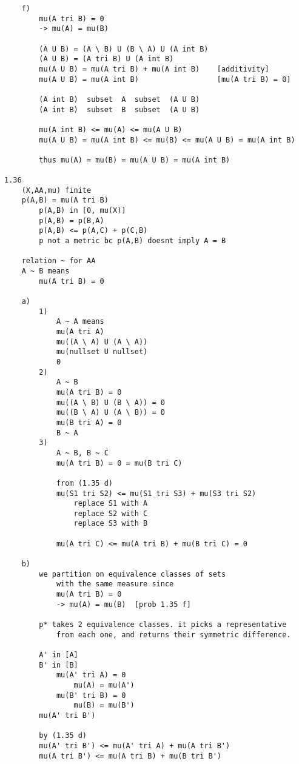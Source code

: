 \documentclass{article}
\begin{document}
\begin{flushleft}
\begin{verbatim}
    f)
        mu(A tri B) = 0
        -> mu(A) = mu(B)

        (A U B) = (A \ B) U (B \ A) U (A int B)
        (A U B) = (A tri B) U (A int B)
        mu(A U B) = mu(A tri B) + mu(A int B)    [additivity]
        mu(A U B) = mu(A int B)                  [mu(A tri B) = 0]

        (A int B)  subset  A  subset  (A U B)        
        (A int B)  subset  B  subset  (A U B)        

        mu(A int B) <= mu(A) <= mu(A U B)
        mu(A U B) = mu(A int B) <= mu(B) <= mu(A U B) = mu(A int B)

        thus mu(A) = mu(B) = mu(A U B) = mu(A int B)

1.36
    (X,AA,mu) finite 
    p(A,B) = mu(A tri B)
        p(A,B) in [0, mu(X)]
        p(A,B) = p(B,A)
        p(A,B) <= p(A,C) + p(C,B)
        p not a metric bc p(A,B) doesnt imply A = B

    relation ~ for AA
    A ~ B means 
        mu(A tri B) = 0

    a)
        1)
            A ~ A means 
            mu(A tri A)
            mu((A \ A) U (A \ A))
            mu(nullset U nullset) 
            0
        2)
            A ~ B 
            mu(A tri B) = 0 
            mu((A \ B) U (B \ A)) = 0
            mu((B \ A) U (A \ B)) = 0
            mu(B tri A) = 0 
            B ~ A
        3)
            A ~ B, B ~ C 
            mu(A tri B) = 0 = mu(B tri C)

            from (1.35 d)
            mu(S1 tri S2) <= mu(S1 tri S3) + mu(S3 tri S2)
                replace S1 with A 
                replace S2 with C 
                replace S3 with B

            mu(A tri C) <= mu(A tri B) + mu(B tri C) = 0

    b)
        we partition on equivalence classes of sets 
            with the same measure since 
            mu(A tri B) = 0 
            -> mu(A) = mu(B)  [prob 1.35 f]

        p* takes 2 equivalence classes. it picks a representative 
            from each one, and returns their symmetric difference. 

        A' in [A]
        B' in [B]
            mu(A' tri A) = 0
                mu(A) = mu(A')
            mu(B' tri B) = 0
                mu(B) = mu(B')
        mu(A' tri B')

        by (1.35 d)
        mu(A' tri B') <= mu(A' tri A) + mu(A tri B')
        mu(A tri B') <= mu(A tri B) + mu(B tri B')


\end{verbatim}
\end{flushleft}
\end{document}
